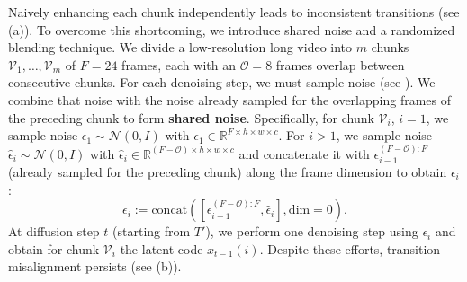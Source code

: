 Naively enhancing each chunk independently leads to inconsistent transitions (see  (a)).
To overcome this shortcoming, we introduce shared noise and a randomized blending technique.  We divide a low-resolution long video into $m$ chunks $\mathcal{V}_{1},\ldots,\mathcal{V}_{m}$ of $F=24$ frames, each with an $\mathcal{O}=8$ frames overlap between consecutive chunks. For each denoising step, we must sample noise (see ). We combine that noise with the noise already sampled for the overlapping frames of the preceding chunk to form \textbf{shared noise}. Specifically, for chunk $\mathcal{V}_{i}$, $i=1$, we sample noise $\epsilon_{1} \sim \mathcal{N}(0,I)$ with $\epsilon_{1} \in \mathbb{R}^{F \times h \times w \times c}$. For $i>1$,  we sample noise $\hat{\epsilon}_{i}\sim \mathcal{N}(0,I)$ with $\hat{\epsilon}_{i} \in \mathbb{R}^{(F-\mathcal{O}) \times h \times w \times c}$  and concatenate it with  $\epsilon_{i-1}^{(F-\mathcal{O}):F}$ (already sampled for the preceding chunk) along the frame dimension to obtain $\epsilon_{i}$ \ie:
\begin{equation}
    \epsilon_{i} := \mathrm{concat}([\epsilon_{i-1}^{(F-\mathcal{O}):F},\hat{\epsilon}_{i}],\mathrm{dim}=0).
\end{equation} 
 At diffusion step $t$ (starting from $T'$), we perform one denoising step using $\epsilon_{i}$ and obtain for chunk $\mathcal{V}_{i}$  the latent code $x_{t-1}(i)$. 
 Despite these efforts, transition misalignment persists (see  (b)).
 

